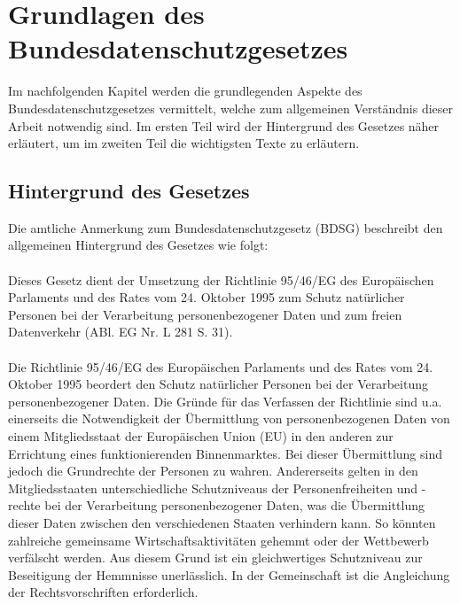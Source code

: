 \chapter{Grundlagen des Bundesdatenschutzgesetzes}
Im nachfolgenden Kapitel werden die grundlegenden Aspekte des Bundesdatenschutzgesetzes vermittelt, welche zum allgemeinen Verständnis dieser Arbeit notwendig sind. Im ersten Teil wird der Hintergrund des Gesetzes näher erläutert, um im zweiten Teil die wichtigsten Texte zu erläutern.
\section{Hintergrund des Gesetzes}
Die amtliche Anmerkung zum Bundesdatenschutzgesetz (\acs{BDSG}) beschreibt den allgemeinen Hintergrund des Gesetzes wie folgt:\\
\\\glqq Dieses Gesetz dient der Umsetzung der Richtlinie 95/46/EG des Europäischen Parlaments und des Rates vom 24. Oktober 1995 zum Schutz natürlicher Personen bei der Verarbeitung personenbezogener Daten und zum freien Datenverkehr (ABl. EG Nr. L 281 S. 31).\grqq \autocite[][]{DeJureBDSG} \\
\\Die Richtlinie 95/46/EG des Europäischen Parlaments und des Rates vom 24. Oktober 1995 beordert den Schutz natürlicher Personen bei der Verarbeitung personenbezogener Daten. Die Gründe für das Verfassen der Richtlinie sind u.a. einerseits die Notwendigkeit der Übermittlung von personenbezogenen Daten von einem Mitgliedsstaat der Europäischen Union (\acs{EU}) in den anderen zur Errichtung eines funktionierenden Binnenmarktes. Bei dieser Übermittlung sind jedoch die Grundrechte der Personen zu wahren. Andererseits gelten in den Mitgliedsstaaten unterschiedliche Schutzniveaus der Personenfreiheiten und -rechte bei der Verarbeitung personenbezogener Daten, was die Übermittlung dieser Daten zwischen den verschiedenen Staaten verhindern kann. So könnten zahlreiche gemeinsame Wirtschaftsaktivitäten gehemmt oder der Wettbewerb verfälscht werden. Aus diesem Grund ist ein gleichwertiges Schutzniveau zur Beseitigung der Hemmnisse unerlässlich. In der Gemeinschaft ist die Angleichung der Rechtsvorschriften erforderlich.\autocite[vgl.][]{EU.1995}\\
\\